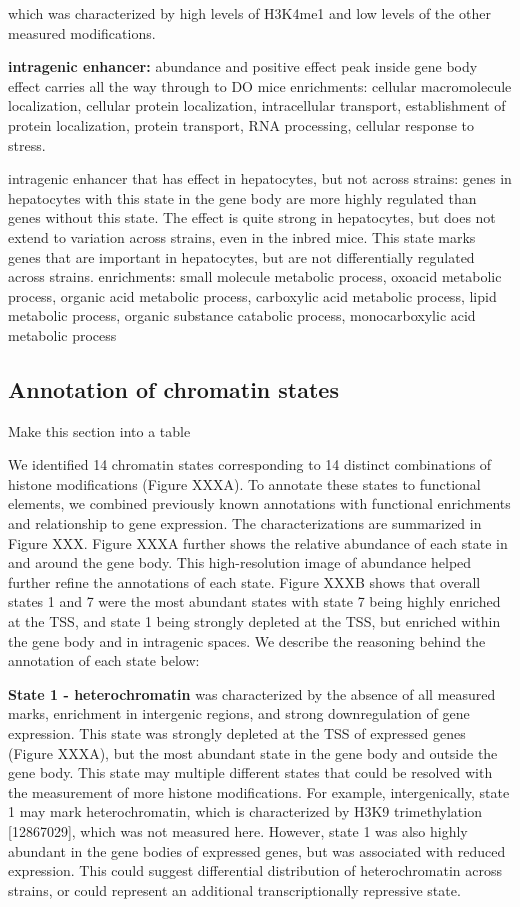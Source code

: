 \documentclass[10pt,letterpaper]{article}
\begin{document}
which was characterized by high levels of H3K4me1 and low levels of the
other measured modifications.

\textbf{intragenic enhancer:} abundance and positive effect peak inside
gene body effect carries all the way through to DO mice enrichments:
cellular macromolecule localization, cellular protein localization,
intracellular transport, establishment of protein localization, protein
transport, RNA processing, cellular response to stress.

intragenic enhancer that has effect in hepatocytes, but not across
strains: genes in hepatocytes with this state in the gene body are more
highly regulated than genes without this state. The effect is quite
strong in hepatocytes, but does not extend to variation across strains,
even in the inbred mice. This state marks genes that are important in
hepatocytes, but are not differentially regulated across strains.
enrichments: small molecule metabolic process, oxoacid metabolic
process, organic acid metabolic process, carboxylic acid metabolic
process, lipid metabolic process, organic substance catabolic process,
monocarboxylic acid metabolic process

\hypertarget{annotation-of-chromatin-states}{%
\subsection{Annotation of chromatin
states}\label{annotation-of-chromatin-states}}

Make this section into a table

We identified 14 chromatin states corresponding to 14 distinct
combinations of histone modifications (Figure XXXA). To annotate these
states to functional elements, we combined previously known annotations
with functional enrichments and relationship to gene expression. The
characterizations are summarized in Figure XXX. Figure XXXA further
shows the relative abundance of each state in and around the gene body.
This high-resolution image of abundance helped further refine the
annotations of each state. Figure XXXB shows that overall states 1 and 7
were the most abundant states with state 7 being highly enriched at the
TSS, and state 1 being strongly depleted at the TSS, but enriched within
the gene body and in intragenic spaces. We describe the reasoning behind
the annotation of each state below:

\textbf{State 1 - heterochromatin} was characterized by the absence of
all measured marks, enrichment in intergenic regions, and strong
downregulation of gene expression. This state was strongly depleted at
the TSS of expressed genes (Figure XXXA), but the most abundant state in
the gene body and outside the gene body. This state may multiple
different states that could be resolved with the measurement of more
histone modifications. For example, intergenically, state 1 may mark
heterochromatin, which is characterized by H3K9 trimethylation
{[}12867029{]}, which was not measured here. However, state 1 was also
highly abundant in the gene bodies of expressed genes, but was
associated with reduced expression. This could suggest differential
distribution of heterochromatin across strains, or could represent an
additional transcriptionally repressive state.
\end{document}
